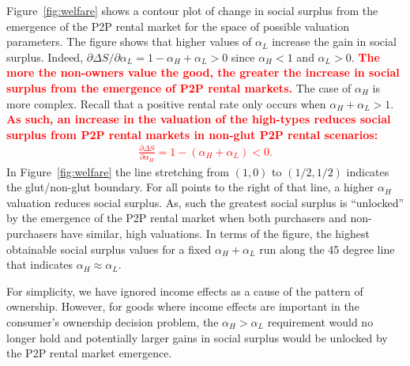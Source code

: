 \documentclass[11pt]{article}
\newcommand{\important}[1]{\textcolor{red}{\textbf{#1}}}
\newcommand{\important}[1]{#1}
\begin{document}
Figure~\ref{fig:welfare} shows a contour plot of change in social surplus from the emergence of the P2P rental market for the space of possible valuation parameters.
The figure shows that higher values of $\alpha_L$ increase the gain in social surplus.
Indeed, $\partial \Delta S/\partial \alpha_L = 1 - \alpha_H + \alpha_L > 0$ since $\alpha_H < 1$ and $\alpha_L > 0$. 
\important{The more the non-owners value the good, the greater the increase in social surplus from the emergence of P2P rental markets.} 
The case of $\alpha_H$ is more complex. 
Recall that a positive rental rate only occurs when $\alpha_H + \alpha_L > 1$.
\important{As such, an increase in the valuation of the high-types reduces social surplus from P2P rental markets in non-glut P2P rental scenarios:   
\begin{align} 
\frac{\partial \Delta S}{\partial \alpha_H} =  1 - (\alpha_H + \alpha_L) < 0.
\end{align}} 
In Figure~\ref{fig:welfare} the line stretching from $(1,0)$ to $(1/2, 1/2)$ indicates the glut/non-glut boundary. 
For all points to the right of that line, a higher $\alpha_H$ valuation reduces social surplus.  
As, such the greatest social surplus is ``unlocked'' by the emergence of the P2P rental market when both purchasers and non-purchasers have similar, high valuations. 
In terms of the figure, the highest obtainable social surplus values for a fixed $\alpha_H + \alpha_L$ run along the 45 degree line that indicates $\alpha_H \approx \alpha_L$. 

For simplicity, we have ignored income effects as a cause of the pattern of ownership. 
However, for goods where income effects are important in the consumer's ownership decision problem, the $\alpha_H > \alpha_L$ requirement would no longer hold and potentially larger gains in social surplus would be unlocked by the P2P rental market emergence. 
\end{document}
